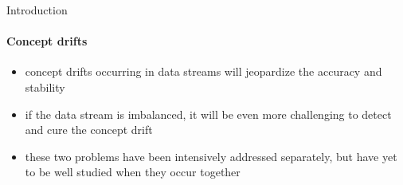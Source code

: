 
\begin{frame}{Introduction}
\framesubtitle{Concept drifts}

\begin{itemize}
    \item concept drifts occurring in data streams will jeopardize the accuracy and stability
    \item if the data stream is imbalanced, it will be even more challenging to detect and cure the concept drift
    \item these two problems have been intensively addressed separately, but have yet to be well studied when they occur together
\end{itemize}

\end{frame}

